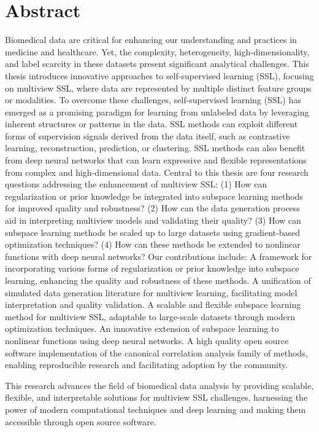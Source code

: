 \chapter*{Abstract}
Biomedical data are critical for enhancing our understanding and practices in medicine and healthcare. Yet, the complexity, heterogeneity, high-dimensionality, and label scarcity in these datasets present significant analytical challenges. This thesis introduces innovative approaches to self-supervised learning (SSL), focusing on multiview SSL, where data are represented by multiple distinct feature groups or modalities. To overcome these challenges, self-supervised learning (SSL) has emerged as a promising
paradigm for learning from unlabeled data by leveraging inherent structures or patterns in the data. SSL methods can exploit different forms of supervision signals derived from the data itself, such as contrastive learning, reconstruction, prediction, or clustering. SSL methods can also benefit from deep neural networks that can learn expressive and flexible representations from complex and high-dimensional data. Central to this thesis are four research questions addressing the enhancement of multiview SSL: (1) How can regularization or prior knowledge be integrated into subspace learning methods for improved quality and robustness? (2) How can the data generation process aid in interpreting multiview models and validating their quality? (3) How can subspace learning methods be scaled up to large datasets using gradient-based optimization techniques? (4) How can these methods be extended to nonlinear functions with deep neural networks?
Our contributions include:
A framework for incorporating various forms of regularization or prior knowledge into subspace learning, enhancing the quality and robustness of these methods. A unification of simulated data generation literature for multiview learning, facilitating model interpretation and quality validation. A scalable and flexible subspace learning method for multiview SSL, adaptable to large-scale datasets through modern optimization techniques. An innovative extension of subspace learning to nonlinear functions using deep neural networks. A high quality open source software implementation of the canonical correlation analysis family of methods, enabling reproducible research and facilitating adoption by the community.

This research advances the field of biomedical data analysis by providing scalable, flexible, and interpretable solutions for multiview SSL challenges, harnessing the power of modern computational techniques and deep learning and making them accessible through open source software.
